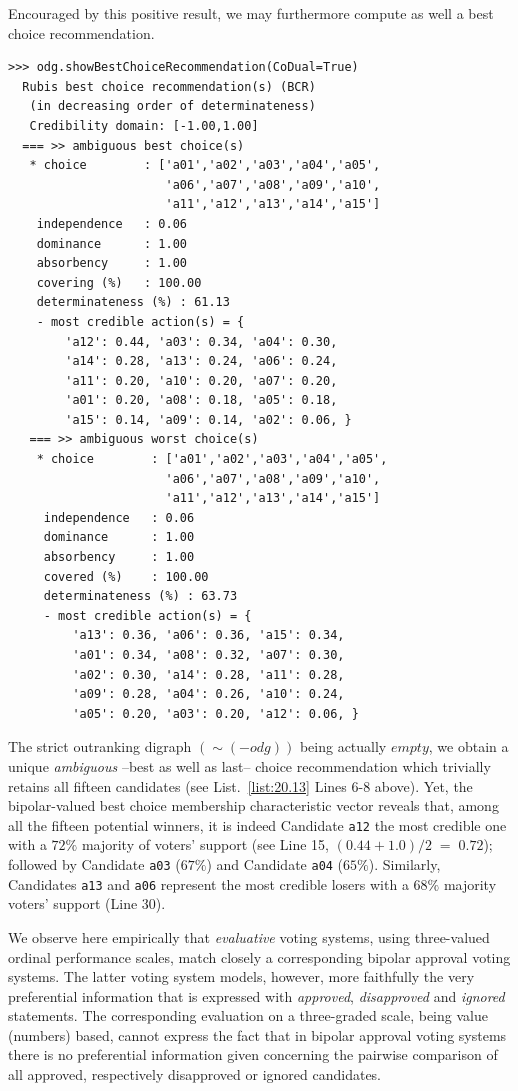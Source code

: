 Encouraged by this positive result, we may furthermore compute as well a best choice recommendation.
\begin{lstlisting}[caption={Computing a best social choice recommendation},label=list:20.13]
>>> odg.showBestChoiceRecommendation(CoDual=True)
  Rubis best choice recommendation(s) (BCR)
   (in decreasing order of determinateness)   
   Credibility domain: [-1.00,1.00]
  === >> ambiguous best choice(s) 
   * choice        : ['a01','a02','a03','a04','a05',
                      'a06','a07','a08','a09','a10',
                      'a11','a12','a13','a14','a15']
    independence   : 0.06
    dominance      : 1.00
    absorbency     : 1.00
    covering (%)   : 100.00
    determinateness (%) : 61.13
    - most credible action(s) = {
        'a12': 0.44, 'a03': 0.34, 'a04': 0.30,
        'a14': 0.28, 'a13': 0.24, 'a06': 0.24,
        'a11': 0.20, 'a10': 0.20, 'a07': 0.20,
        'a01': 0.20, 'a08': 0.18, 'a05': 0.18,
        'a15': 0.14, 'a09': 0.14, 'a02': 0.06, }
   === >> ambiguous worst choice(s)
    * choice        : ['a01','a02','a03','a04','a05',
                      'a06','a07','a08','a09','a10',
                      'a11','a12','a13','a14','a15']
     independence   : 0.06
     dominance      : 1.00
     absorbency     : 1.00
     covered (%)    : 100.00
     determinateness (%) : 63.73
     - most credible action(s) = {
         'a13': 0.36, 'a06': 0.36, 'a15': 0.34,
         'a01': 0.34, 'a08': 0.32, 'a07': 0.30,
         'a02': 0.30, 'a14': 0.28, 'a11': 0.28,
         'a09': 0.28, 'a04': 0.26, 'a10': 0.24,
         'a05': 0.20, 'a03': 0.20, 'a12': 0.06, }
\end{lstlisting}
The strict outranking digraph $(\sim (-odg))$ being actually $empty$, we obtain a unique \emph{ambiguous} --best as well as last-- choice recommendation which trivially retains all fifteen candidates (see List.~\vref{list:20.13} Lines 6-8 above). Yet, the bipolar-valued best choice membership characteristic vector reveals that, among all the fifteen potential winners, it is indeed Candidate \texttt{a12} the most credible one with a $72\%$ majority of voters' support (see Line 15, $(0.44 + 1.0)/2\;=\; 0.72$); followed by Candidate \texttt{a03} ($67\%$) and Candidate \texttt{a04} ($65\%$). Similarly, Candidates \texttt{a13} and \texttt{a06} represent the most credible losers with a $68\%$ majority voters' support (Line 30).

We observe here empirically that \emph{evaluative} voting systems, using three-valued ordinal performance scales, match closely a corresponding bipolar approval voting systems. The latter voting system models, however, more faithfully the very preferential information that is expressed with \emph{approved}, \emph{disapproved} and \emph{ignored} statements. The corresponding evaluation on a three-graded scale, being value (numbers) based, cannot express the fact that in bipolar approval voting systems there is no preferential information given concerning the pairwise comparison of all approved, respectively disapproved or ignored candidates.

